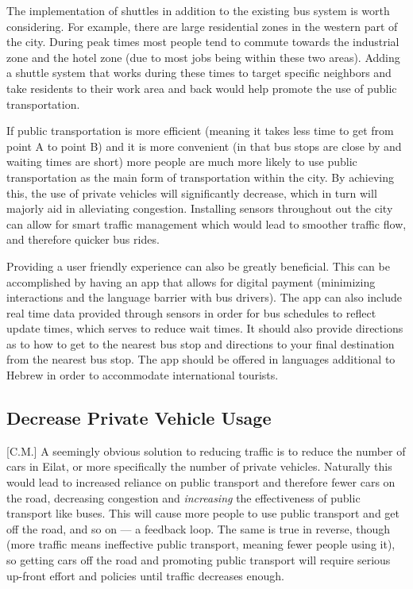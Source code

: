 \documentclass[12pt]{article}                       %
\begin{document}
The implementation of shuttles in addition to the existing bus system is worth considering. For example, there are large residential zones in the western part of the city. During peak times most people tend to commute towards the industrial zone and the hotel zone (due to most jobs being within these two areas). Adding a shuttle system that works during these times to target specific neighbors and take residents to their work area and back would help promote the use of public transportation.
    
If public transportation is more efficient (meaning it takes less time to get from point A to point B) and it is more convenient (in that bus stops are close by and waiting times are short) more people are much more likely to use public transportation as the main form of transportation within the city. By achieving this, the use of private vehicles will significantly decrease, which in turn will majorly aid in alleviating congestion. Installing sensors throughout out the city can allow for smart traffic management which would lead to smoother traffic flow, and therefore quicker bus rides.

Providing a user friendly experience can also be greatly beneficial. This can be accomplished by having an app that allows for digital payment (minimizing interactions and the language barrier with bus drivers). The app can also include real time data provided through sensors in order for bus schedules to reflect update times, which serves to reduce wait times. It should also provide directions as to how to get to the nearest bus stop and directions to your final destination from the nearest bus stop. The app should be offered in languages additional to Hebrew in order to accommodate international tourists. 

\subsection{Decrease Private Vehicle Usage}[C.M.]
A seemingly obvious solution to reducing traffic is to reduce the number of cars in Eilat, or more specifically the number of private vehicles. Naturally this would lead to increased reliance on public transport and therefore fewer cars on the road, decreasing congestion and \textit{increasing} the effectiveness of public transport like buses. This will cause more people to use public transport and get off the road, and so on --- a feedback loop. The same is true in reverse, though (more traffic means ineffective public transport, meaning fewer people using it), so getting cars off the road and promoting public transport will require serious up-front effort and policies until traffic decreases enough.
\end{document}
